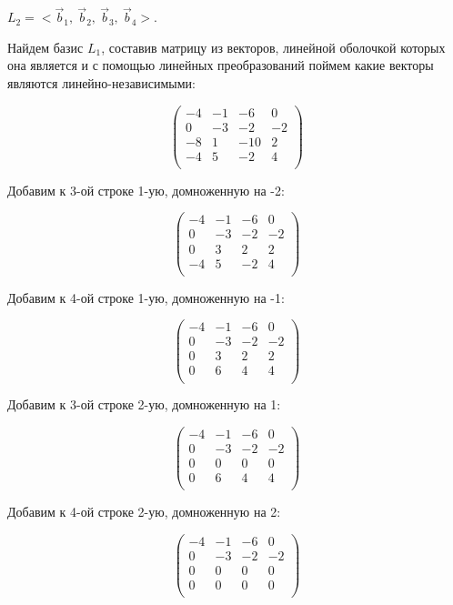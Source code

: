 	$L_2 = <\vec b_1,\ \vec b_2,\ \vec b_3,\ \vec b_4>$.
	
	Найдем базис $L_1$, составив матрицу из векторов, линейной оболочкой которых она является и с помощью линейных преобразований поймем какие векторы являются линейно-независимыми:
	
	\[
	\begin{pmatrix}
	-4 & -1 & -6 & 0 \\
	0 & -3 & -2 & -2 \\
	-8 & 1 & -10 & 2 \\
	-4 & 5 & -2 & 4 \\
	\end{pmatrix}
	\]
	
	Добавим к 3-ой строке 1-ую, домноженную на -2:
	
	\[
	\begin{pmatrix}
	-4 & -1 & -6 & 0 \\
	0 & -3 & -2 & -2 \\
	0 & 3 & 2 & 2 \\
	-4 & 5 & -2 & 4 \\
	\end{pmatrix}
	\]
	
	Добавим к 4-ой строке 1-ую, домноженную на -1:
	
	\[
	\begin{pmatrix}
	-4 & -1 & -6 & 0 \\
	0 & -3 & -2 & -2 \\
	0 & 3 & 2 & 2 \\
	0 & 6 & 4 & 4 \\
	\end{pmatrix}
	\]
	
	Добавим к 3-ой строке 2-ую, домноженную на 1:
	
	\[
	\begin{pmatrix}
	-4 & -1 & -6 & 0 \\
	0 & -3 & -2 & -2 \\
	0 & 0 & 0 & 0 \\
	0 & 6 & 4 & 4 \\
	\end{pmatrix}
	\]
	
	Добавим к 4-ой строке 2-ую, домноженную на 2:
	
	\[
	\begin{pmatrix}
	-4 & -1 & -6 & 0 \\
	0 & -3 & -2 & -2 \\
	0 & 0 & 0 & 0 \\
	0 & 0 & 0 & 0 \\
	\end{pmatrix}
	\]
	
